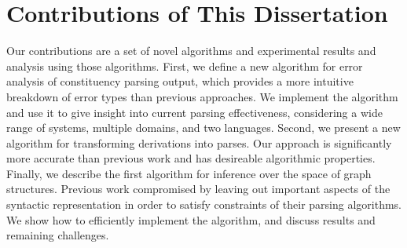 \section{Contributions of This Dissertation}

Our contributions are a set of novel algorithms and experimental results and analysis using those algorithms.
First, we define a new algorithm for error analysis of constituency parsing output, which provides a more intuitive breakdown of error types than previous approaches.
We implement the algorithm and use it to give insight into current parsing effectiveness, considering a wide range of systems, multiple domains, and two languages.
Second, we present a new algorithm for transforming \ccg derivations into \gb parses.
Our approach is significantly more accurate than previous work and has desireable algorithmic properties.
Finally, we describe the first algorithm for inference over the space of \gb graph structures.
Previous work compromised by leaving out important aspects of the syntactic representation in order to satisfy constraints of their parsing algorithms.
We show how to efficiently implement the algorithm, and discuss results and remaining challenges.

